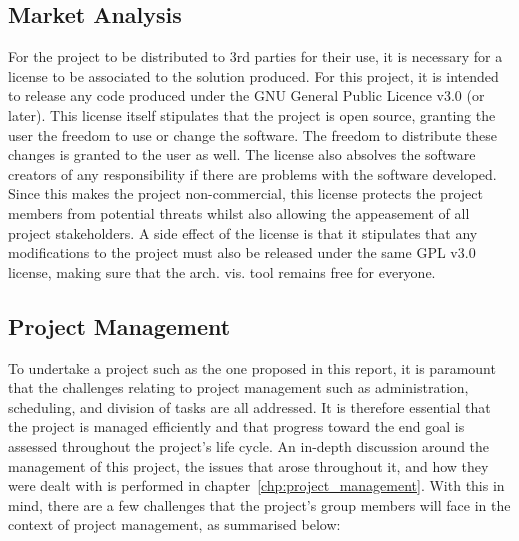     \subsection{Market Analysis}
    
        For the project to be distributed to 3rd parties for their use, it is necessary for a license to be associated to the solution produced. For this project, it is intended to release any code produced under the GNU General Public Licence v3.0 (or later). This license itself stipulates that the project is open source, granting the user the freedom to use or change the software. The freedom to distribute these changes is granted to the user as well. The license also absolves the software creators of any responsibility if there are problems with the software developed. Since this makes the project non-commercial, this license protects the project members from potential threats whilst also allowing the appeasement of all project stakeholders. A side effect of the license is that it stipulates that any modifications to the project must also be released under the same GPL v3.0 license, making sure that the arch. vis. tool remains free for everyone.
    
    \subsection{Project Management}
    
        To undertake a project such as the one proposed in this report, it is paramount that the challenges relating to project management such as administration, scheduling, and division of tasks are all addressed. It is therefore essential that the project is managed efficiently and that progress toward the end goal is assessed throughout the project's life cycle. An in-depth discussion around the management of this project, the issues that arose throughout it, and how they were dealt with is performed in chapter~\ref{chp:project_management}. With this in mind, there are a few challenges that the project's group members will face in the context of project management, as summarised below:
        

